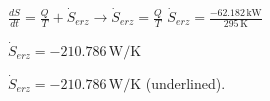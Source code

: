 \( \frac{dS}{dt} = \frac{Q}{T} + \dot{S}_{erz} \rightarrow \dot{S}_{erz} = \frac{Q}{T} \)  
\( \dot{S}_{erz} = \frac{-62.182 \, \text{kW}}{295 \, \text{K}} \)  

\( \dot{S}_{erz} = -210.786 \, \text{W/K} \)  

\( \dot{S}_{erz} = -210.786 \, \text{W/K} \) (underlined).